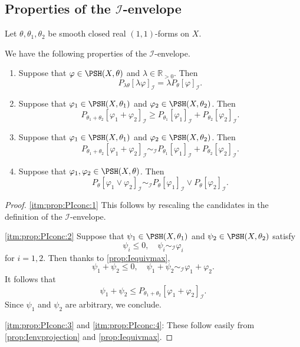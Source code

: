 \subsection{Properties of the \texorpdfstring{$\mathcal{I}$}{I}-envelope}
\label{subsec:Ienv_prop}
Let $\theta,\theta_1,\theta_2$ be smooth closed real $(1,1)$-forms on $X$.

We have the following properties of the $\mathcal{I}$-envelope.
\begin{proposition}\label{prop:PIconc}
    \leavevmode
    \begin{enumerate}
        \item\label{itm:prop:PIconc:1} Suppose that $\varphi\in \PSH(X,\theta)$ and $\lambda\in \mathbb{R}_{>0}$. Then
            \[
                P_{\lambda\theta}[\lambda\varphi]_{\mathcal{I}}=\lambda P_{\theta}[\varphi]_{\mathcal{I}}.
            \]
        \item\label{itm:prop:PIconc:2} Suppose that $\varphi_1\in \PSH(X,\theta_1)$ and $\varphi_2\in \PSH(X,\theta_2)$. Then
            \[
                P_{\theta_1+\theta_2}[\varphi_1+\varphi_2]_{\mathcal{I}}\geq P_{\theta_1}[\varphi_1]_{\mathcal{I}}+P_{\theta_2}[\varphi_2]_{\mathcal{I}}.
            \]
        \item\label{itm:prop:PIconc:3}
        Suppose that $\varphi_1\in \PSH(X,\theta_1)$ and $\varphi_2\in \PSH(X,\theta_2)$. Then
            \[
                P_{\theta_1+\theta_2}[\varphi_1+\varphi_2]_{\mathcal{I}}\sim_{\mathcal{I}} P_{\theta_1}[\varphi_1]_{\mathcal{I}}+P_{\theta_2}[\varphi_2]_{\mathcal{I}}.
            \]
        \item\label{itm:prop:PIconc:4}
            Suppose that $\varphi_1,\varphi_2\in \PSH(X,\theta)$. Then
                \[
                    P_{\theta}[\varphi_1\lor \varphi_2]_{\mathcal{I}}\sim_{\mathcal{I}} P_{\theta}[\varphi_1]_{\mathcal{I}}\lor P_{\theta}[\varphi_2]_{\mathcal{I}}.
                \]
    \end{enumerate}
\end{proposition}
\begin{proof}
    \ref{itm:prop:PIconc:1} This follows by rescaling the candidates in the definition of the $\mathcal{I}$-envelope.

    \ref{itm:prop:PIconc:2} Suppose that $\psi_1\in \PSH(X,\theta_1)$ and $\psi_2\in \PSH(X,\theta_2)$ satisfy
    \[
        \psi_i\leq 0,\quad \psi_i \sim_{\mathcal{I}} \varphi_i
    \]
    for $i=1,2$. Then thanks to \cref{prop:Iequivmax},
    \[
        \psi_1+\psi_2\leq 0,\quad \psi_1+\psi_2 \sim_{\mathcal{I}} \varphi_1+\varphi_2.
    \]
    It follows that
    \[
        \psi_1+\psi_2\leq P_{\theta_1+\theta_2}[\varphi_1+\varphi_2]_{\mathcal{I}}.
    \]
    Since $\psi_1$ and $\psi_2$ are arbitrary, we conclude.

    \ref{itm:prop:PIconc:3} and \ref{itm:prop:PIconc:4}: These follow easily from \cref{prop:Ienvprojection} and \cref{prop:Iequivmax}.
\end{proof}

